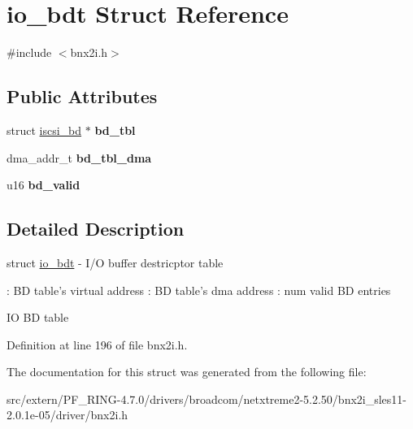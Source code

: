 \hypertarget{structio__bdt}{
\section{io\_\-bdt Struct Reference}
\label{structio__bdt}
}


{\ttfamily \#include $<$bnx2i.h$>$}

\subsection*{Public Attributes}
\begin{DoxyCompactItemize}
\item 
\hypertarget{structio__bdt_a7aca06717511caed7136da64bc4a7c25}{
struct \hyperlink{structiscsi__bd}{iscsi\_\-bd} $\ast$ {\bfseries bd\_\-tbl}}
\label{structio__bdt_a7aca06717511caed7136da64bc4a7c25}

\item 
\hypertarget{structio__bdt_a51b8851a05c1844746ddab91d3f10938}{
dma\_\-addr\_\-t {\bfseries bd\_\-tbl\_\-dma}}
\label{structio__bdt_a51b8851a05c1844746ddab91d3f10938}

\item 
\hypertarget{structio__bdt_a89719f93f41e895f13570372ba46e28b}{
u16 {\bfseries bd\_\-valid}}
\label{structio__bdt_a89719f93f41e895f13570372ba46e28b}

\end{DoxyCompactItemize}


\subsection{Detailed Description}
struct \hyperlink{structio__bdt}{io\_\-bdt} -\/ I/O buffer destricptor table

: BD table's virtual address : BD table's dma address : num valid BD entries

IO BD table 

Definition at line 196 of file bnx2i.h.



The documentation for this struct was generated from the following file:\begin{DoxyCompactItemize}
\item 
src/extern/PF\_\-RING-\/4.7.0/drivers/broadcom/netxtreme2-\/5.2.50/bnx2i\_\-sles11-\/2.0.1e-\/05/driver/bnx2i.h\end{DoxyCompactItemize}
